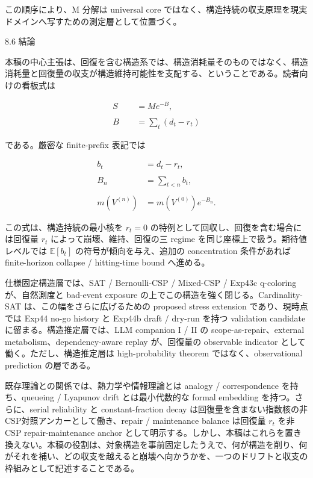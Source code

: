 \documentclass[12pt,a4paper]{article}
\begin{document}
この順序により、M 分解は universal core ではなく、構造持続の収支原理を現実ドメインへ写すための測定層として位置づく。

8.6 結論

本稿の中心主張は、回復を含む構造系では、構造消耗量そのものではなく、構造消耗量と回復量の収支が構造維持可能性を支配する、ということである。読者向けの看板式は

\[
\begin{aligned}
S &= M e^{-B}, \\
\qquad \\
B&=\sum_{t}(d_{t}-r_{t})
\end{aligned}
\]

である。厳密な finite-prefix 表記では

\[
\begin{aligned}
b_{t}&=d_{t}-r_{t}, \\
\qquad \\
B_{n}&=\sum_{t<n}b_{t}, \\
\qquad \\
m(V^{(n)})&=m(V^{(0)})e^{-B_{n}}.
\end{aligned}
\]

この式は、構造持続の最小核を \(r_{t}=0\) の特例として回収し、回復を含む場合には回復量 \(r_{t}\) によって崩壊、維持、回復の三 regime を同じ座標上で扱う。期待値レベルでは \(\mathbb E[b_{t}]\) の符号が傾向を与え、追加の concentration 条件があれば finite-horizon collapse / hitting-time bound へ進める。

仕様固定構造層では、SAT / Bernoulli-CSP / Mixed-CSP / Exp43c q-coloring が、自然測度と bad-event exposure の上でこの構造を強く閉じる。Cardinality-SAT は、この幅をさらに広げるための proposed stress extension であり、現時点では Exp44 no-go history と Exp44b draft / dry-run を持つ validation candidate に留まる。構造推定層では、LLM companion I / II の scope-as-repair、external metabolism、dependency-aware replay が、回復量の observable indicator として働く。ただし、構造推定層は high-probability theorem ではなく、observational prediction の層である。

既存理論との関係では、熱力学や情報理論とは analogy / correspondence を持ち、queueing / Lyapunov drift とは最小代数的な formal embedding を持つ。さらに、serial reliability と constant-fraction decay は回復量を含まない指数核の非CSP対照アンカーとして働き、repair / maintenance balance は回復量 \(r_{t}\) を非CSP repair-maintenance anchor として明示する。しかし、本稿はこれらを置き換えない。本稿の役割は、対象構造を事前固定したうえで、何が構造を削り、何がそれを補い、どの収支を越えると崩壊へ向かうかを、一つのドリフトと収支の枠組みとして記述することである。
\end{document}
